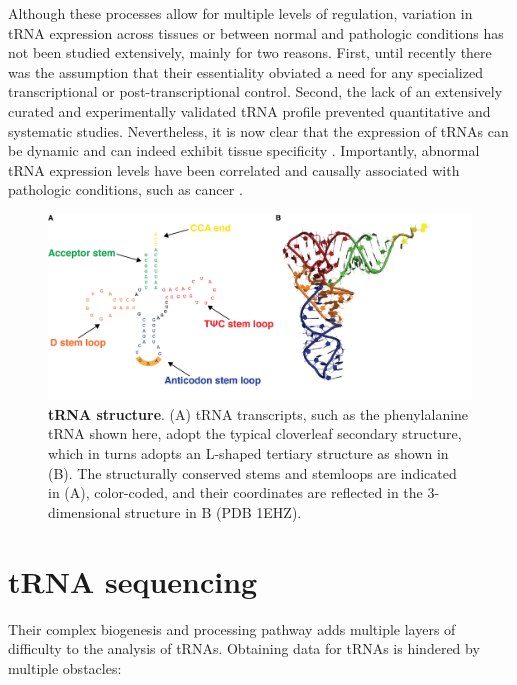 \documentclass[12pt]{rockefeller}
\begin{document}
Although these processes allow for multiple levels of regulation, variation in tRNA expression across tissues or between normal and pathologic conditions has not been studied extensively, mainly for two reasons. First, until recently there was the assumption that their essentiality obviated a need for any specialized transcriptional or post-transcriptional control. Second, the lack of an extensively curated and experimentally validated tRNA profile prevented quantitative and systematic studies. Nevertheless, it is now clear that the expression of tRNAs can be dynamic and can indeed exhibit tissue specificity \cite{Dittmar:2006du,Gingold:2014iz}. Importantly, abnormal tRNA expression levels have been correlated and causally associated with pathologic conditions, such as cancer \cite{Gingold:2014iz,Goodarzi:2016gd}.

\begin{figure}[!ht]%
\centering
\includegraphics[width=\textwidth]{tRNA_general_structure.png}%
\caption[tRNA structure]{\textbf{tRNA structure}. (A) tRNA transcripts, such as the phenylalanine tRNA shown here, adopt the typical cloverleaf secondary structure, which in turns adopts an L-shaped tertiary structure as shown in (B). The structurally conserved stems and stemloops are indicated in (A), color-coded, and their coordinates are reflected in the 3-dimensional structure in B (PDB 1EHZ).
}
\label{tRNAstructure}%
\end{figure}


\section{tRNA sequencing}
Their complex biogenesis and processing pathway adds multiple layers of difficulty to the analysis of tRNAs. Obtaining  data for tRNAs is hindered by multiple obstacles:
\end{document}
